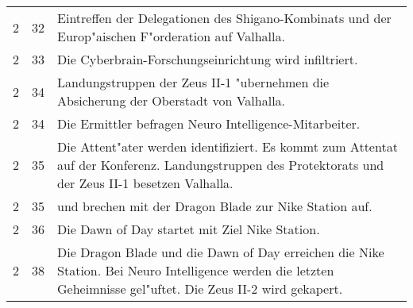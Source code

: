 \begin{boxedtext}
\begin{tabularx}{\textwidth}{r r X}
        2       &   32 & Eintreffen der Delegationen des Shigano-Kombinats und der Europ"aischen F"orderation auf Valhalla.\\
        2       &   33 & Die Cyberbrain-Forschungseinrichtung wird infiltriert.\\
        2       &   34 & Landungstruppen der Zeus II-1 "ubernehmen die Absicherung der Oberstadt von Valhalla.\\
        2       &   34 & Die Ermittler befragen Neuro Intelligence-Mitarbeiter.\\
        2       &   35 & Die Attent"ater werden identifiziert. Es kommt zum Attentat auf der Konferenz. Landungstruppen des 
                         Protektorats und der Zeus II-1 besetzen Valhalla. \\
        2       &   35 & \xl{} und \ml{} brechen mit der Dragon Blade zur Nike Station auf.\\
        2       &   36 & Die Dawn of Day startet mit Ziel Nike Station.\\
        2       &   38 & Die Dragon Blade und die Dawn of Day erreichen die Nike Station. Bei Neuro Intelligence werden die letzten 
                         Geheimnisse gel"uftet. Die Zeus II-2 wird gekapert.\\
    \end{tabularx}
\end{boxedtext}
\renewcommand{\arraystretch}{1}
\pagebreak

